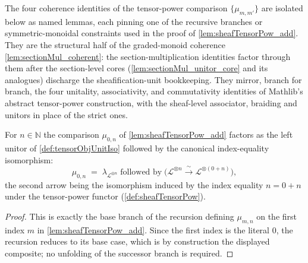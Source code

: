The four coherence identities of the tensor-power comparison
\(\{\mu_{m,m'}\}\) are isolated below as named lemmas, each pinning one of the
recursive branches or symmetric-monoidal constraints used in the proof of
\cref{lem:sheafTensorPow_add}. They are the structural half of the graded-monoid
coherence \cref{lem:sectionMul_coherent}: the section-multiplication identities
factor through them after the section-level cores
(\cref{lem:sectionMul_unitor_core} and its analogues) discharge the
sheafification-unit bookkeeping. They mirror, branch for branch, the four unitality, associativity, and
commutativity identities of Mathlib's abstract tensor-power construction, with the
sheaf-level associator, braiding and unitors in place of the strict ones.

\begin{lemma}
  \label{lem:tensorPowAdd_zero}
  For \(n \in \mathbb{N}\) the comparison \(\mu_{0,n}\) of
  \cref{lem:sheafTensorPow_add} factors as the left unitor of
  \cref{def:tensorObjUnitIso} followed by the canonical index-equality
  isomorphism:
  \[
    \mu_{0,n}
      \;=\;
      \lambda_{\mathcal{L}^{\otimes n}}
      \;\textrm{followed by}\;
      \bigl(\mathcal{L}^{\otimes n}
        \xrightarrow{\ \sim\ } \mathcal{L}^{\otimes (0+n)}\bigr),
  \]
  the second arrow being the isomorphism induced by the index equality
  \(n = 0+n\) under the tensor-power functor (\cref{def:sheafTensorPow}).
\end{lemma}

\begin{proof}
  This is exactly the base branch of the recursion defining \(\mu_{m,n}\) on the
  first index \(m\) in \cref{lem:sheafTensorPow_add}. Since the first index is the
  literal \(0\), the recursion reduces to its base case, which is by construction
  the displayed composite; no unfolding of the successor branch is required.
\end{proof}

